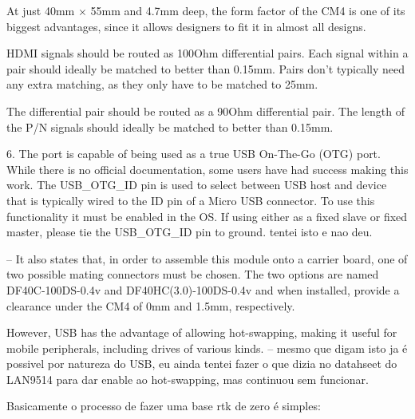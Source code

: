     At just 40mm $\times$ 55mm and 4.7mm deep, the form factor of the CM4 is one of its biggest advantages, since it allows designers to fit it in almost all designs.

    HDMI signals should be routed as 100Ohm differential pairs. Each signal within a pair should ideally be matched to better than 0.15mm. Pairs don't typically need any extra matching, as they only have to be matched to 25mm.

    The differential pair should be routed as a 90Ohm differential pair. The length of the P/N signals should ideally be matched to better than 0.15mm.

    6. The port is capable of being used as a true USB On-The-Go (OTG) port. While there is no official documentation, some users have had success making this work. The USB\_OTG\_ID pin is used to select between USB host and device that is typically wired to the ID pin of a Micro USB connector. To use this functionality it must be enabled in the OS. If using either as a fixed slave or fixed master, please tie the USB\_OTG\_ID pin to ground. tentei isto e nao deu.

	-- It also states that, in order to assemble this module onto a carrier board, one of two possible mating connectors must be chosen. The two options are named DF40C-100DS-0.4v and DF40HC(3.0)-100DS-0.4v and when installed, provide a clearance under the CM4 of 0mm and 1.5mm, respectively. 

    However, USB has the advantage of allowing hot-swapping, making it useful for mobile peripherals, including drives of various kinds. -- mesmo que digam isto ja é possivel por natureza do USB, eu ainda tentei fazer o que dizia no datahseet do LAN9514 para dar enable ao hot-swapping, mas continuou sem funcionar.


Basicamente o processo de fazer uma base rtk de zero é simples:
